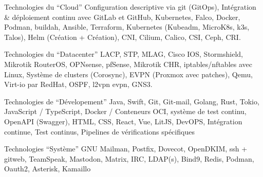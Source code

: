 
\begin{cvskills}

  \cvskill
    {Technologies du ``Cloud''}
    {
      Configuration descriptive via git (GitOps), Intégration \& déploiement continu avec GitLab et GitHub, \break
      Kubernetes, Falco, Docker, Podman, buildah, Ansible, Terraform, Kubernetes \break
      (Kubeadm, MicroK8s, k3s, Talos), Helm (Création + Création), CNI, Cilium, Calico, CSI, Ceph, CRI.
    }

    \cvskill
    {Technologies du ``Datacenter''}
    {
      LACP, STP, MLAG, Cisco IOS, Stormshield, Mikrotik RouterOS, OPNsense, pfSense, Mikrotik CHR,          \break
      iptables/nftables avec Linux, Système de clusters (Corosync), EVPN (Proxmox avec patches), Qemu,      \break
      Virt-io par RedHat, OSPF, l2vpn evpn, GNS3.
    }

    \cvskill
    {Technologies de ``Dévelopement''}
    {
      Java, Swift, Git, Git-mail, Golang, Rust, Tokio, JavaScript / TypeScript, Docker / Conteneurs OCI,    \break
      système de test continu, OpenAPI (Swagger), HTML, CSS, React, Vue, LitJS, DevOPS,                     \break
      Intégration continue, Test continus, Pipelines de vérifications spécifiques                           \break
    }

    \cvskill
    {Technologies ``Système''}
    {
      GNU Mailman, Postfix, Dovecot, OpenDKIM, ssh + gitweb, TeamSpeak, Mastodon, Matrix, IRC, LDAP(s), \break
      Bind9, Redis, Podman, Oauth2, Asterisk, Kamaillo   \break
    }

\end{cvskills}
